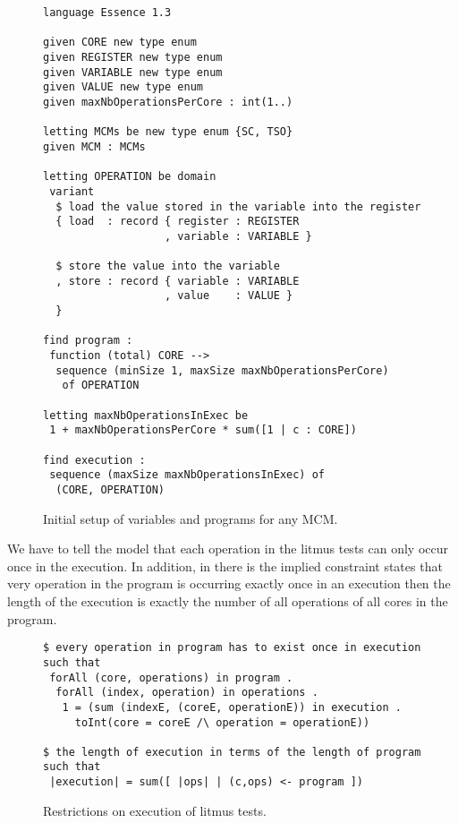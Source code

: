 \documentclass[runningheads]{llncs}
\begin{document}
\begin{figure}
\begin{lstlisting}
language Essence 1.3

given CORE new type enum
given REGISTER new type enum
given VARIABLE new type enum
given VALUE new type enum
given maxNbOperationsPerCore : int(1..)

letting MCMs be new type enum {SC, TSO}
given MCM : MCMs

letting OPERATION be domain
 variant
  $ load the value stored in the variable into the register
  { load  : record { register : REGISTER
                   , variable : VARIABLE }

  $ store the value into the variable
  , store : record { variable : VARIABLE
                   , value    : VALUE }
  }

find program :
 function (total) CORE -->
  sequence (minSize 1, maxSize maxNbOperationsPerCore)
   of OPERATION

letting maxNbOperationsInExec be
 1 + maxNbOperationsPerCore * sum([1 | c : CORE])

find execution :
 sequence (maxSize maxNbOperationsInExec) of
  (CORE, OPERATION)
\end{lstlisting}
\caption{Initial setup of variables and programs for any MCM.\label{fig:essence1}}
\end{figure}


We have to tell the model that each operation in the litmus tests can only occur once in the execution.
In addition, in  there is the implied constraint states that very operation in the program is occurring exactly once in an execution then the length of the execution is exactly the number of all operations of all cores in the program.

\begin{figure}
\begin{lstlisting}
$ every operation in program has to exist once in execution
such that
 forAll (core, operations) in program .
  forAll (index, operation) in operations .
   1 = (sum (indexE, (coreE, operationE)) in execution .
     toInt(core = coreE /\ operation = operationE))

$ the length of execution in terms of the length of program
such that
 |execution| = sum([ |ops| | (c,ops) <- program ])
\end{lstlisting}
\caption{Restrictions on execution of litmus tests.\label{fig:essence2}}
\end{figure}
\end{document}
